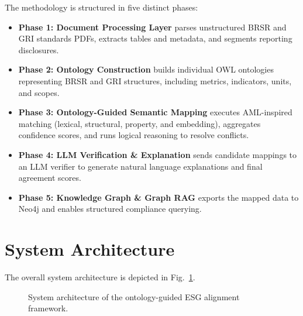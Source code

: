 \documentclass[journal,compsoc]{IEEEtran}
\begin{document}
\begin{itemize}
\begin{table}[t]
\begin{itemize}
The methodology is structured in five distinct phases:
\begin{itemize}
    \item \textbf{Phase 1: Document Processing Layer} parses unstructured BRSR and GRI standards PDFs, extracts tables and metadata, and segments reporting disclosures.
    \item \textbf{Phase 2: Ontology Construction} builds individual OWL ontologies representing BRSR and GRI structures, including metrics, indicators, units, and scopes.
    \item \textbf{Phase 3: Ontology-Guided Semantic Mapping} executes AML-inspired matching (lexical, structural, property, and embedding), aggregates confidence scores, and runs logical reasoning to resolve conflicts.
    \item \textbf{Phase 4: LLM Verification \& Explanation} sends candidate mappings to an LLM verifier to generate natural language explanations and final agreement scores.
    \item \textbf{Phase 5: Knowledge Graph \& Graph RAG} exports the mapped data to Neo4j and enables structured compliance querying.
\end{itemize}

\section{System Architecture}
The overall system architecture is depicted in Fig.~\ref{fig:framework}.

\begin{figure}[t]
\centering
{}
\caption{System architecture of the ontology-guided ESG alignment framework.}
\label{fig:framework}
\end{figure}


\end{itemize}
\end{table}
\end{itemize}
\end{document}

